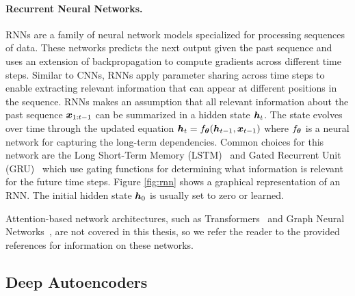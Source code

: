 \paragraph{Recurrent Neural Networks.} RNNs are a family of neural network models specialized for processing sequences of data. These networks predicts the next output given the past sequence and uses an extension of backpropagation to compute gradients across different time steps. 
Similar to CNNs, RNNs apply parameter sharing across time steps to enable extracting relevant information that can appear at different positions in the sequence. RNNs makes an assumption that all relevant information about the past sequence ${\bm{x}}_{1:t-1}$ can be summarized in a hidden state ${\bm{h}}_t$. The state evolves over time through the updated equation ${\bm{h}}_t = f_{{\bm{\theta}}}({\bm{h}}_{t-1}, {\bm{x}}_{t-1})$ where $f_{{\bm{\theta}}}$ is a neural network for capturing the long-term dependencies. Common choices for this network are the Long Short-Term Memory (LSTM)~\cite{hochreiter1997long} and Gated Recurrent Unit (GRU)~\cite{chung2014empirical} which use gating functions for determining what information is relevant for the future time steps. Figure \ref{fig:rnn} shows a graphical representation of an RNN. The initial hidden state ${\bm{h}}_0$ is usually set to zero or learned. 

\vspace{3mm}
\noindent Attention-based network architectures, such as Transformers~\cite{vaswani2017attention, dosovitskiy2020image} and Graph Neural Networks~\cite{battaglia2018relational, zhou2020graph}, are not covered in this thesis, so we refer the reader to the provided references for information on these networks.



\subsection{Deep Autoencoders}\label{sec:deep_autoencoders}

